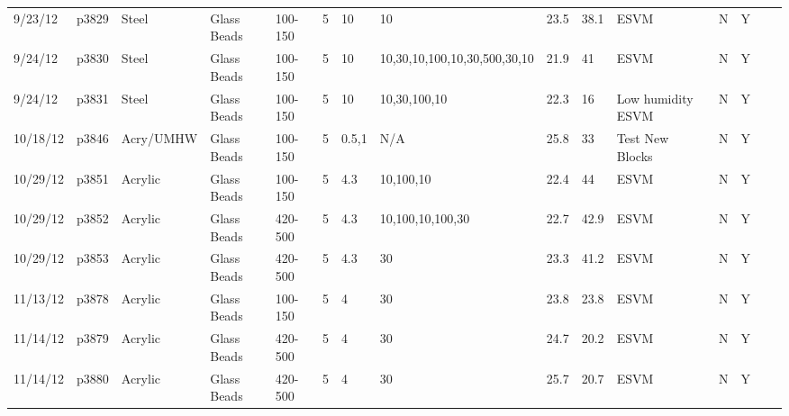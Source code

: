 \begin{landscape}
\begin{longtable}{lllllllllllllll}
9/23/12  & p3829      & Steel            & Glass Beads  & 100-150      & 5         & 10            & 10                           & 23.5        & 38.1     & ESVM                                            & N     & Y    &  &  \\
9/24/12  & p3830      & Steel            & Glass Beads  & 100-150      & 5         & 10            & 10,30,10,100,10,30,500,30,10 & 21.9        & 41       & ESVM                                            & N     & Y    &  &  \\
9/24/12  & p3831      & Steel            & Glass Beads  & 100-150      & 5         & 10            & 10,30,100,10                 & 22.3        & 16       & Low humidity ESVM                               & N     & Y    &  &  \\
10/18/12 & p3846      & Acry/UMHW        & Glass Beads  & 100-150      & 5         & 0.5,1         & N/A                          & 25.8        & 33       & Test New Blocks                                 & N     & Y    &  &  \\
10/29/12 & p3851      & Acrylic          & Glass Beads  & 100-150      & 5         & 4.3           & 10,100,10                    & 22.4        & 44       & ESVM                                            & N     & Y    &  &  \\
10/29/12 & p3852      & Acrylic          & Glass Beads  & 420-500      & 5         & 4.3           & 10,100,10,100,30             & 22.7        & 42.9     & ESVM                                            & N     & Y    &  &  \\
10/29/12 & p3853      & Acrylic          & Glass Beads  & 420-500      & 5         & 4.3           & 30                           & 23.3        & 41.2     & ESVM                                            & N     & Y    &  &  \\
11/13/12 & p3878      & Acrylic          & Glass Beads  & 100-150      & 5         & 4             & 30                           & 23.8        & 23.8     & ESVM                                            & N     & Y    &  &  \\
11/14/12 & p3879      & Acrylic          & Glass Beads  & 420-500      & 5         & 4             & 30                           & 24.7        & 20.2     & ESVM                                            & N     & Y    &  &  \\
11/14/12 & p3880      & Acrylic          & Glass Beads  & 420-500      & 5         & 4             & 30                           & 25.7        & 20.7     & ESVM                                            & N     & Y    &  &  \\

\end{longtable}
\end{landscape}

